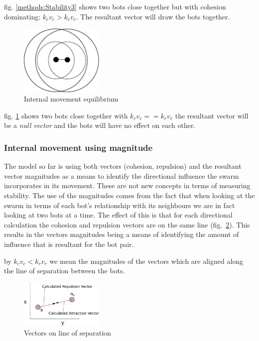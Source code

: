 \documentclass[10pt,journal,letterpaper,twoside]{IEEEtran}
\newcommand{\Stability}{Internal movement}
\newcommand{\Fig}{fig.}
\begin{document}
\Fig{} \ref{methods:Stability3} shows two bots close together but with
cohesion dominating: $k_cv_c > k_cv_c$. The resultant vector will draw
the bots together.

\begin{figure}[H]
\begin{center}
\includegraphics[width=4cm]{figures/Stability4}
\end{center}
\caption{\Stability{} equilibrium} \label{methods:Stability4}
\end{figure}

\Fig{} \ref{methods:Stability4} shows two bots close together with
$k_cv_c == k_rv_r$ the resultant vector will be a \textit{null vector}
and the bots will have no effect on each other.

\subsubsection{\Stability{} using magnitude}\label{Section:StabilityMagnatude}

The model so far is using both vectors (cohesion, repulsion) and the
resultant vector magnitudes as a means to identify the directional
influence the swarm incorporates in its movement. These are not new
concepts in terms of measuring stability. The use of the magnitudes
comes from the fact that when looking at the swarm in terms of each
bot's relationship with its neighbours we are in fact looking at two
bots at a time. The effect of this is that for each directional
calculation the cohesion and repulsion vectors are on the same line
(\Fig{}~\ref{methods:Stability5}). This results in the vectors
magnitudes being a means of identifying the amount of influence that
is resultant for the bot pair.

by $k_cv_c < k_rv_r$ we mean the magnitudes of the vectors which are
aligned along the line of separation between the bots.

\begin{figure}[H]
\begin{center}
\includegraphics[width=4cm]{figures/Stability5}
\end{center}
\caption{Vectors on line of separation} \label{methods:Stability5}
\end{figure}
\end{document}
